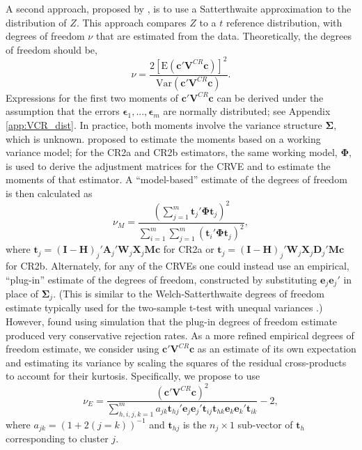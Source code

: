 \documentclass[12pt]{article}\usepackage[]{graphicx}\usepackage[]{color}
\newcommand{\E}{\text{E}}
\newcommand{\Var}{\text{Var}}
\newcommand{\bm}{\mathbf}
\newcommand{\bs}{\boldsymbol}
\begin{document}
A second approach, proposed by \citet{McCaffrey2001generalizations}, is to use a Satterthwaite approximation \citep{Satterthwaite1946approximate} to the distribution of $Z$.
This approach compares $Z$ to a $t$ reference distribution, with degrees of freedom $\nu$ that are estimated from the data. 
Theoretically, the degrees of freedom should be, \[
\nu = \frac{2\left[\E\left(\bm{c}'\bm{V}^{CR}\bm{c}\right)\right]^2}{\Var\left(\bm{c}'\bm{V}^{CR}\bm{c}\right)}.
\]
Expressions for the first two moments of $\bm{c}'\bm{V}^{CR}\bm{c}$ can be derived under the assumption that the errors $\bs\epsilon_1,...,\bs\epsilon_m$ are normally distributed; see Appendix \ref{app:VCR_dist}. 
In practice, both moments involve the variance structure $\bs\Sigma$, which is unknown. 
\citet{McCaffrey2001generalizations} proposed to estimate the moments based on a working variance model; for the CR2a and CR2b estimators, the same working model, $\bs\Phi$, is used to derive the adjustment matrices for the CRVE and to estimate the moments of that estimator. 
A ``model-based'' estimate of the degrees of freedom is then calculated as 
\begin{equation}
\nu_{M} = \frac{\left(\sum_{j=1}^m \bm{t}_j' \bs\Phi \bm{t}_j\right)^2}{\sum_{i=1}^m \sum_{j=1}^m \left(\bm{t}_i' \bs\Phi \bm{t}_j\right)^2},
\end{equation}
where $\bm{t}_j = \left(\bm{I} - \bm{H}\right)_j'\bm{A}_j'\bm{W}_j\bm{X}_j\bm{M}\bm{c}$ for CR2a or $\bm{t}_j = \left(\bm{I} - \bm{H}\right)_j'\bm{W}_j\bm{X}_j\bm{D}_j'\bm{M}\bm{c}$ for CR2b. Alternately, for any of the CRVEs one could instead use an empirical, ``plug-in'' estimate of the degrees of freedom, constructed by substituting $\bm{e}_j \bm{e}_j'$ in place of $\bs\Sigma_j$. (This is similar to the Welch-Satterthwaite degrees of freedom estimate typically used for the two-sample t-test with unequal variances \citep{Satterthwaite1946approximate}.) However, \citet{Bell2002bias} found using simulation that the plug-in degrees of freedom estimate produced very conservative rejection rates. As a more refined empirical degrees of freedom estimate, we consider using $\bm{c}'\bm{V}^{CR}\bm{c}$ as an estimate of its own expectation and estimating its variance by scaling the squares of the residual cross-products to account for their kurtosis. Specifically, we propose to use 
\begin{equation}
\nu_{E} = \frac{\left(\bm{c}'\bm{V}^{CR}\bm{c}\right)^2}{\sum_{h,i,j,k=1}^m a_{jk}\bm{t}_{hj}' \bm{e}_j \bm{e}_j' \bm{t}_{ij} \bm{t}_{hk} \bm{e}_k \bm{e}_k' \bm{t}_{ik}} - 2,
\end{equation}
where $a_{jk} = \left(1 + 2(j=k)\right)^{-1}$ and $\bm{t}_{hj}$ is the $n_j \times 1$ sub-vector of $\bm{t}_h$ corresponding to cluster $j$. 
\end{document}
